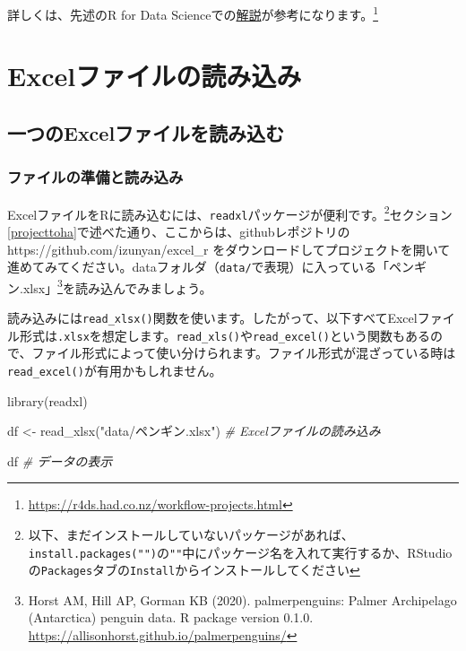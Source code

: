 \documentclass[
  xelatex,ja=standard, b5paper]{bxjsbook}
\newenvironment{Shaded}{\begin{snugshade}}{\end{snugshade}}
\newcommand{\CommentTok}[1]{\textcolor[rgb]{0.56,0.35,0.01}{\textit{#1}}}
\newcommand{\FunctionTok}[1]{\textcolor[rgb]{0.00,0.00,0.00}{#1}}
\newcommand{\NormalTok}[1]{#1}
\newcommand{\OtherTok}[1]{\textcolor[rgb]{0.56,0.35,0.01}{#1}}
\newcommand{\StringTok}[1]{\textcolor[rgb]{0.31,0.60,0.02}{#1}}
\begin{document}
詳しくは、先述のR for Data Scienceでの\href{https://r4ds.had.co.nz/workflow-projects.html}{解説}が参考になります。\footnote{\url{https://r4ds.had.co.nz/workflow-projects.html}}

\hypertarget{readexcel}{%
\chapter{Excelファイルの読み込み}\label{readexcel}}

\hypertarget{readoneexcel}{%
\section{一つのExcelファイルを読み込む}\label{readoneexcel}}

\hypertarget{junbiyomikomi}{%
\subsection{ファイルの準備と読み込み}\label{junbiyomikomi}}

ExcelファイルをRに読み込むには、\texttt{readxl}パッケージが便利です。\footnote{以下、まだインストールしていないパッケージがあれば、\texttt{install.packages("")}の\texttt{""}中にパッケージ名を入れて実行するか、RStudioの\texttt{Packages}タブの\texttt{Install}からインストールしてください}セクション\ref{projecttoha}で述べた通り、ここからは、githubレポジトリのhttps://github.com/izunyan/excel\_r をダウンロードしてプロジェクトを開いて進めてみてください。dataフォルダ（\texttt{data/}で表現）に入っている「ペンギン.xlsx」\footnote{Horst AM, Hill AP, Gorman KB (2020). palmerpenguins: Palmer Archipelago
  (Antarctica) penguin data. R package version 0.1.0.
  \url{https://allisonhorst.github.io/palmerpenguins/}}を読み込んでみましょう。

読み込みには\texttt{read\_xlsx()}関数を使います。したがって、以下すべてExcelファイル形式は\texttt{.xlsx}を想定します。\texttt{read\_xls()}や\texttt{read\_excel()}という関数もあるので、ファイル形式によって使い分けられます。ファイル形式が混ざっている時は\texttt{read\_excel()}が有用かもしれません。

\begin{Shaded}
\begin{Highlighting}[]
\FunctionTok{library}\NormalTok{(readxl)}

\NormalTok{df }\OtherTok{\textless{}{-}} 
 \FunctionTok{read\_xlsx}\NormalTok{(}\StringTok{"data/ペンギン.xlsx"}\NormalTok{) }\CommentTok{\# Excelファイルの読み込み}

\NormalTok{df }\CommentTok{\# データの表示 }
\end{Highlighting}
\end{Shaded}
\end{document}
